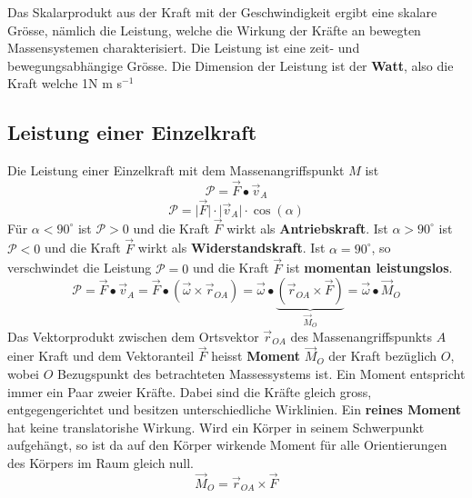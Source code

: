 Das Skalarprodukt aus der Kraft mit der Geschwindigkeit ergibt eine skalare Grösse, nämlich die Leistung, welche die Wirkung der Kräfte an bewegten Massensystemen charakterisiert. Die Leistung ist eine zeit- und bewegungsabhängige Grösse. Die Dimension der Leistung ist der \textbf{Watt}, also die Kraft welche 1N m s$^{-1}$
\subsection{Leistung einer Einzelkraft}
Die Leistung einer Einzelkraft mit dem Massenangriffspunkt $M$ ist
\begin{equation}
\boxed{\mathcal{P}=\overrightarrow{F}\bullet \overrightarrow{v}_A}
\end{equation}
\begin{equation}
\boxed{\mathcal{P}=\Big\vert\overrightarrow{F}\Big\vert\cdot \Big\vert\overrightarrow{v}_A\Big\vert\cdot \cos\left(\alpha\right)}
\end{equation}
Für $\alpha<90^{\circ}$ ist $\mathcal{P}>0$ und die Kraft $\overrightarrow{F}$ wirkt als \textbf{Antriebskraft}. Ist $\alpha>90^{\circ}$ ist $\mathcal{P}<0$ und die Kraft $\overrightarrow{F}$ wirkt als \textbf{Widerstandskraft}. Ist $\alpha=90^{\circ}$, so verschwindet die Leistung $\mathcal{P}=0$ und die Kraft $\overrightarrow{F}$ ist \textbf{momentan leistungslos}.
\begin{equation}
\boxed{\mathcal{P}=\overrightarrow{F}\bullet \overrightarrow{v}_A=\overrightarrow{F}\bullet \left(\overrightarrow{\omega}\times\overrightarrow{r}_{OA}\right)=\overrightarrow{\omega}\bullet \underbrace{\left(\overrightarrow{r}_{OA}\times \overrightarrow{F}\right)}_{\overrightarrow{M}_O}=\overrightarrow{\omega}\bullet \overrightarrow{M}_O}
\end{equation}
Das Vektorprodukt zwischen dem Ortsvektor $\overrightarrow{r}_{OA}$ des Massenangriffspunkts $A$ einer Kraft und dem Vektoranteil $\overrightarrow{F}$ heisst \textbf{Moment} $\overrightarrow{M}_O$ der Kraft bezüglich $O$, wobei $O$ Bezugspunkt des betrachteten Massessystems ist. Ein Moment entspricht immer ein Paar zweier Kräfte. Dabei sind die Kräfte gleich gross, entgegengerichtet und besitzen unterschiedliche Wirklinien. Ein \textbf{reines Moment} hat keine translatorishe Wirkung. Wird ein Körper in seinem Schwerpunkt aufgehängt, so ist da auf den Körper wirkende Moment für alle Orientierungen des Körpers im Raum gleich null.
\begin{equation}
\boxed{\overrightarrow{M}_O=\overrightarrow{r}_{OA}\times \overrightarrow{F}}
\end{equation}
